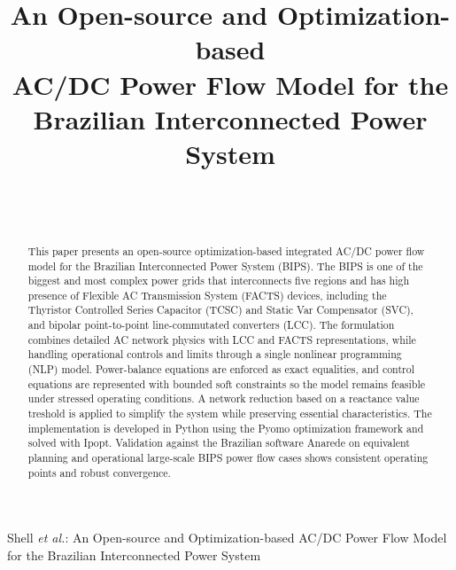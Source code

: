 \documentclass[letterpaper,journal]{IEEEtran}
\begin{document}
\title{{\fontsize{24pt}{24pt}\selectfont An Open-source and Optimization-based\\ AC/DC Power Flow Model for the Brazilian Interconnected Power System}}

\author{
	\\
	 \\
}
\markboth{}%
{Shell \MakeLowercase{\textit{et al.}}: An Open-source and Optimization-based AC/DC Power Flow Model for the Brazilian Interconnected Power System}

\IEEEpubid{}

\maketitle

\begingroup
{}
\begin{abstract}
	This paper presents an open-source optimization-based integrated AC/DC power flow model for the
	Brazilian Interconnected Power System (BIPS). The BIPS is one of the biggest and most complex power 
	grids that interconnects five regions and has high presence of Flexible AC Transmission System (FACTS) devices, 
	including the Thyristor Controlled Series Capacitor (TCSC) and Static Var Compensator (SVC), 
	and bipolar point-to-point line-commutated converters (LCC). The formulation combines detailed AC network physics
	with LCC and FACTS representations, while handling operational controls and limits through a single
	nonlinear programming (NLP) model. Power-balance equations are enforced as exact equalities, and
	control equations are represented with bounded soft constraints so the model remains feasible under
	stressed operating conditions. A network reduction based on a reactance value treshold is applied to simplify the system while preserving essential characteristics.
	The implementation is developed in Python using the Pyomo optimization framework and solved with
	Ipopt. Validation against the Brazilian software Anarede on equivalent planning and operational large-scale BIPS
	power flow cases shows consistent operating points and robust convergence.
\end{abstract}
\endgroup
\end{document}
